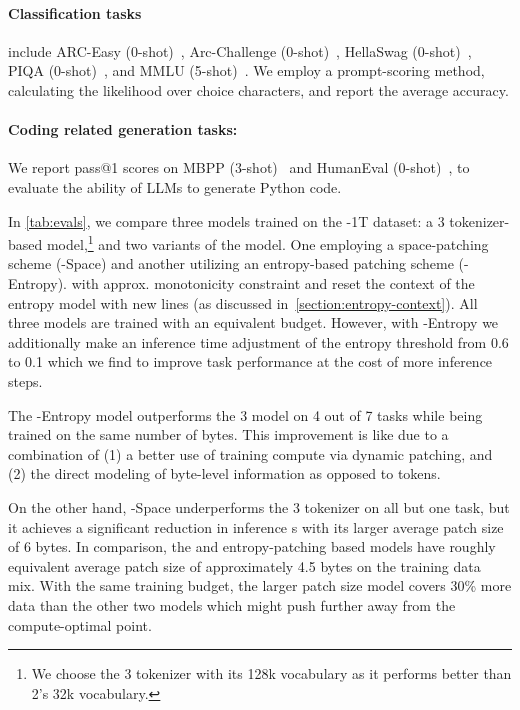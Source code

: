 \documentclass[]{fairmeta}
\begin{document}
\paragraph{Classification tasks} include ARC-Easy (0-shot)~\citep{Eval_ARC}, Arc-Challenge (0-shot)~\citep{Eval_ARC}, HellaSwag (0-shot)~\citep{Eval_hellaswag}, PIQA (0-shot)~\citep{Eval_piqa}, and MMLU (5-shot)~\citep{hendrycks2020measuring}.  We employ a prompt-scoring method, calculating the likelihood over choice characters, and report the average accuracy.
\paragraph{Coding related generation tasks:}  We report pass@1 scores on MBPP (3-shot)~\citep{Eval_MBPP} and HumanEval (0-shot)~\citep{Eval_HumanEval}, to evaluate the ability of LLMs to generate Python code.



In \autoref{tab:evals}, we compare three models trained on the \model{}-1T dataset: a \bpe{} \llama{} 3 tokenizer-based model,\footnote{We choose the \llama{} 3 tokenizer with its 128k vocabulary as it performs better than \llama{} 2's 32k vocabulary.} and two variants of the \model{} model. One employing a space-patching scheme (\model{}-Space) and another utilizing an entropy-based patching scheme (\model{}-Entropy). with approx. monotonicity constraint and reset the context of the entropy model with new lines (as discussed in~\autoref{section:entropy-context}). All three models are trained with an equivalent \flop{} budget. However, with \model{}-Entropy we additionally make an inference time adjustment of the entropy threshold from 0.6 to 0.1 which we find to improve task performance at the cost of more inference steps.

The \model{}-Entropy model outperforms the \llama{} 3 model on 4 out of 7 tasks while being trained on the same number of bytes. This improvement is like due to a combination of (1) a better use of training compute via dynamic patching, and (2) the direct modeling of byte-level information as opposed to tokens.

On the other hand, \model{}-Space underperforms the \llama{} 3 tokenizer on all but one task, but it achieves a significant reduction in inference \flop{}s with its larger average patch size of 6 bytes.
In comparison, the \bpe{} and entropy-patching based models have roughly equivalent average patch size of approximately 4.5 bytes on the training data mix. With the same training budget, the larger patch size model covers 30\% more data than the other two models which might push \model{} further away from the compute-optimal point.
\end{document}
